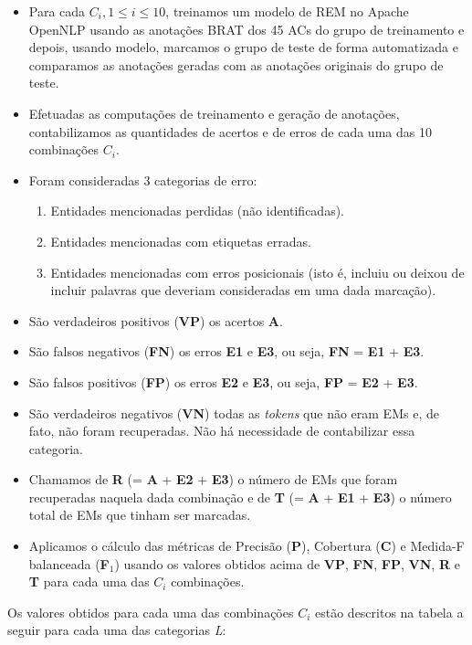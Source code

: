 \documentclass[11pt]{report}
\begin{document}
\begin{itemize}
  \item Para cada $C_i, 1 \leq i \leq 10$, treinamos um modelo de REM no Apache OpenNLP usando as anotações BRAT dos 45 ACs do grupo de treinamento e depois, usando modelo, marcamos
o grupo de teste de forma automatizada e comparamos as anotações geradas com as anotações originais do grupo de teste.
  \item Efetuadas as computações de treinamento e geração de anotações, contabilizamos as quantidades de acertos e de erros de cada uma das 10 combinações $C_i$.
  \item Foram consideradas 3 categorias de erro:
  \begin{enumerate}[label={\textbf{E\arabic*.}}]
    \item Entidades mencionadas perdidas (não identificadas).
    \item Entidades mencionadas com etiquetas erradas.
    \item Entidades mencionadas com erros posicionais (isto é, incluiu ou deixou de incluir palavras que deveriam consideradas em uma dada marcação).
  \end{enumerate}
  \item São verdadeiros positivos (\textbf{VP}) os acertos \textbf{A}.
  \item São falsos negativos (\textbf{FN}) os erros \textbf{E1} e \textbf{E3}, ou seja, \textbf{FN} = \textbf{E1} + \textbf{E3}.
  \item São falsos positivos (\textbf{FP}) os erros \textbf{E2} e \textbf{E3}, ou seja, \textbf{FP} = \textbf{E2} + \textbf{E3}.
  \item São verdadeiros negativos (\textbf{VN}) todas as \textit{tokens} que não eram EMs e, de fato, não foram recuperadas. Não há necessidade de contabilizar essa categoria.
  \item Chamamos de \textbf{R} (= \textbf{A} + \textbf{E2} + \textbf{E3}) o número de EMs que foram recuperadas naquela dada combinação e de \textbf{T} (= \textbf{A} + \textbf{E1} + \textbf{E3}) o número total de EMs que tinham ser marcadas.
  \item Aplicamos o cálculo das métricas de Precisão (\textbf{P}), Cobertura (\textbf{C}) e Medida-F balanceada (\textbf{F$_1$}) usando os valores obtidos acima de \textbf{VP}, \textbf{FN}, \textbf{FP}, \textbf{VN}, \textbf{R} e \textbf{T} para cada uma das $C_i$ combinações.
\end{itemize}

Os valores obtidos para cada uma das combinações $C_i$ estão descritos na tabela a seguir para cada uma das categorias \textit{L}:
\end{document}
